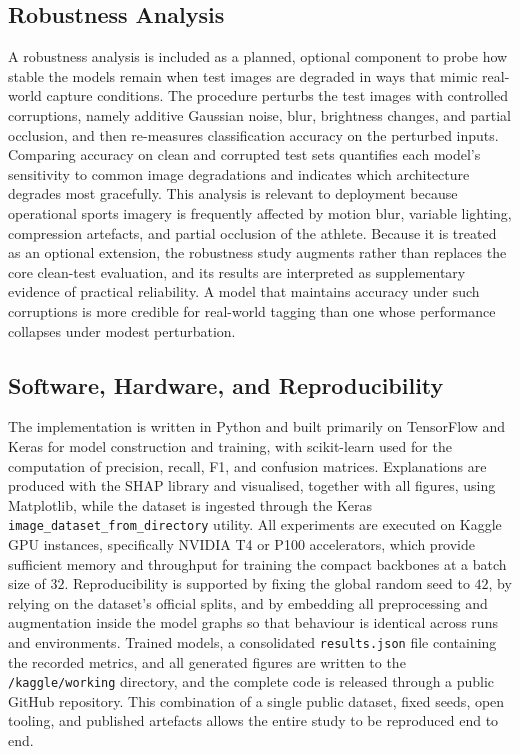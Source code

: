 \subsection{Robustness Analysis}
\label{subsec:method-robustness}

A robustness analysis is included as a planned, optional component to probe how stable the models remain when test images are degraded in ways that mimic real-world capture conditions.
The procedure perturbs the test images with controlled corruptions, namely additive Gaussian noise, blur, brightness changes, and partial occlusion, and then re-measures classification accuracy on the perturbed inputs.
Comparing accuracy on clean and corrupted test sets quantifies each model's sensitivity to common image degradations and indicates which architecture degrades most gracefully.
This analysis is relevant to deployment because operational sports imagery is frequently affected by motion blur, variable lighting, compression artefacts, and partial occlusion of the athlete.
Because it is treated as an optional extension, the robustness study augments rather than replaces the core clean-test evaluation, and its results are interpreted as supplementary evidence of practical reliability.
A model that maintains accuracy under such corruptions is more credible for real-world tagging than one whose performance collapses under modest perturbation.

\subsection{Software, Hardware, and Reproducibility}
\label{subsec:method-software}

The implementation is written in Python and built primarily on TensorFlow and Keras for model construction and training, with scikit-learn used for the computation of precision, recall, F1, and confusion matrices.
Explanations are produced with the SHAP library and visualised, together with all figures, using Matplotlib, while the dataset is ingested through the Keras \texttt{image\_dataset\_from\_directory} utility.
All experiments are executed on Kaggle GPU instances, specifically NVIDIA T4 or P100 accelerators, which provide sufficient memory and throughput for training the compact backbones at a batch size of $32$.
Reproducibility is supported by fixing the global random seed to $42$, by relying on the dataset's official splits, and by embedding all preprocessing and augmentation inside the model graphs so that behaviour is identical across runs and environments.
Trained models, a consolidated \texttt{results.json} file containing the recorded metrics, and all generated figures are written to the \texttt{/kaggle/working} directory, and the complete code is released through a public GitHub repository.
This combination of a single public dataset, fixed seeds, open tooling, and published artefacts allows the entire study to be reproduced end to end.

